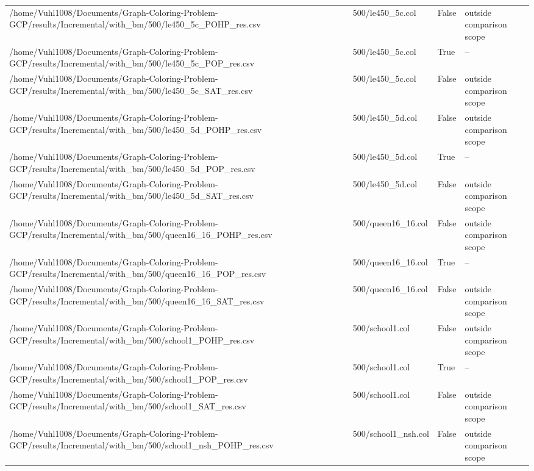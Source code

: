 \begin{table}[htbp]
\begin{tabular}{llll}
/home/Vuhl1008/Documents/Graph-Coloring-Problem-GCP/results/Incremental/with\_bm/500/le450\_5c\_POHP\_res.csv & 500/le450\_5c.col & False & outside comparison scope \\
/home/Vuhl1008/Documents/Graph-Coloring-Problem-GCP/results/Incremental/with\_bm/500/le450\_5c\_POP\_res.csv & 500/le450\_5c.col & True & -- \\
/home/Vuhl1008/Documents/Graph-Coloring-Problem-GCP/results/Incremental/with\_bm/500/le450\_5c\_SAT\_res.csv & 500/le450\_5c.col & False & outside comparison scope \\
/home/Vuhl1008/Documents/Graph-Coloring-Problem-GCP/results/Incremental/with\_bm/500/le450\_5d\_POHP\_res.csv & 500/le450\_5d.col & False & outside comparison scope \\
/home/Vuhl1008/Documents/Graph-Coloring-Problem-GCP/results/Incremental/with\_bm/500/le450\_5d\_POP\_res.csv & 500/le450\_5d.col & True & -- \\
/home/Vuhl1008/Documents/Graph-Coloring-Problem-GCP/results/Incremental/with\_bm/500/le450\_5d\_SAT\_res.csv & 500/le450\_5d.col & False & outside comparison scope \\
/home/Vuhl1008/Documents/Graph-Coloring-Problem-GCP/results/Incremental/with\_bm/500/queen16\_16\_POHP\_res.csv & 500/queen16\_16.col & False & outside comparison scope \\
/home/Vuhl1008/Documents/Graph-Coloring-Problem-GCP/results/Incremental/with\_bm/500/queen16\_16\_POP\_res.csv & 500/queen16\_16.col & True & -- \\
/home/Vuhl1008/Documents/Graph-Coloring-Problem-GCP/results/Incremental/with\_bm/500/queen16\_16\_SAT\_res.csv & 500/queen16\_16.col & False & outside comparison scope \\
/home/Vuhl1008/Documents/Graph-Coloring-Problem-GCP/results/Incremental/with\_bm/500/school1\_POHP\_res.csv & 500/school1.col & False & outside comparison scope \\
/home/Vuhl1008/Documents/Graph-Coloring-Problem-GCP/results/Incremental/with\_bm/500/school1\_POP\_res.csv & 500/school1.col & True & -- \\
/home/Vuhl1008/Documents/Graph-Coloring-Problem-GCP/results/Incremental/with\_bm/500/school1\_SAT\_res.csv & 500/school1.col & False & outside comparison scope \\
/home/Vuhl1008/Documents/Graph-Coloring-Problem-GCP/results/Incremental/with\_bm/500/school1\_nsh\_POHP\_res.csv & 500/school1\_nsh.col & False & outside comparison scope \\

\end{tabular}
\end{table}
